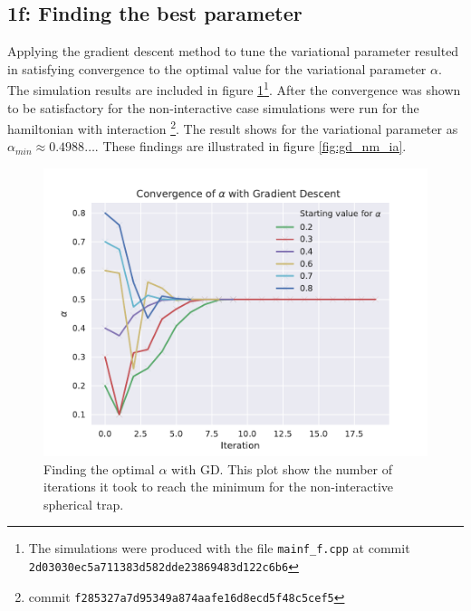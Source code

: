 \subsection*{\textbf{1f:} Finding the best parameter}
Applying the gradient descent method to tune the variational parameter resulted in satisfying convergence to the optimal value for the variational parameter $\alpha$. The simulation results are included in figure \ref{fig:gd_nm_nia}\footnote{The simulations were produced with the file \lstinline{mainf_f.cpp} at commit \lstinline{2d03030ec5a711383d582dde23869483d122c6b6}}. After the convergence was shown to be satisfactory for the non-interactive case simulations were run for the hamiltonian with interaction \footnote{commit \lstinline{f285327a7d95349a874aafe16d8ecd5f48c5cef5}}. The result shows for the variational parameter as  $\alpha_{min} \approx 0.4988\ldots$. These findings are illustrated in figure \ref{fig:gd_nm_ia}. 


\begin{figure}
\includegraphics{figures/GD_NM_NIA.pdf}
\caption{Finding the optimal $\alpha$ with GD. This plot show the number of iterations it took to reach the minimum for the non-interactive spherical trap.}\label{fig:gd_nm_nia}
\end{figure} 

